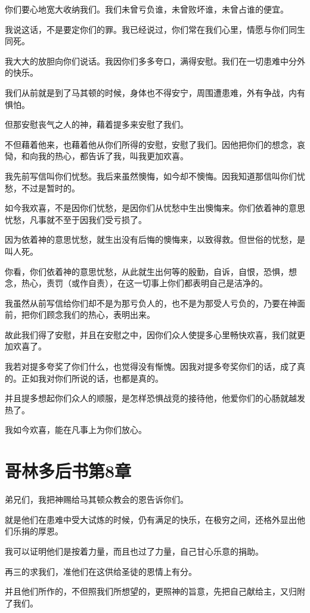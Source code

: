 \documentclass[12pt,oneside]{book}
\begin{document}
你们要心地宽大收纳我们。我们未曾亏负谁，未曾败坏谁，未曾占谁的便宜。

我说这话，不是要定你们的罪。我已经说过，你们常在我们心里，情愿与你们同生同死。

我大大的放胆向你们说话。我因你们多多夸口，满得安慰。我们在一切患难中分外的快乐。

我们从前就是到了马其顿的时候，身体也不得安宁，周围遭患难，外有争战，内有惧怕。

但那安慰丧气之人的神，藉着提多来安慰了我们。

不但藉着他来，也藉着他从你们所得的安慰，安慰了我们。因他把你们的想念，哀恸，和向我的热心，都告诉了我，叫我更加欢喜。

我先前写信叫你们忧愁。我后来虽然懊悔，如今却不懊悔。因我知道那信叫你们忧愁，不过是暂时的。

如今我欢喜，不是因你们忧愁，是因你们从忧愁中生出懊悔来。你们依着神的意思忧愁，凡事就不至于因我们受亏损了。

因为依着神的意思忧愁，就生出没有后悔的懊悔来，以致得救。但世俗的忧愁，是叫人死。

你看，你们依着神的意思忧愁，从此就生出何等的殷勤，自诉，自恨，恐惧，想念，热心，责罚（或作自责），在这一切事上你们都表明自己是洁净的。

我虽然从前写信给你们却不是为那亏负人的，也不是为那受人亏负的，乃要在神面前，把你们顾念我们的热心，表明出来。

故此我们得了安慰，并且在安慰之中，因你们众人使提多心里畅快欢喜，我们就更加欢喜了。

我若对提多夸奖了你们什么，也觉得没有惭愧。因我对提多夸奖你们的话，成了真的。正如我对你们所说的话，也都是真的。

并且提多想起你们众人的顺服，是怎样恐惧战竞的接待他，他爱你们的心肠就越发热了。

我如今欢喜，能在凡事上为你们放心。

\chapter{哥林多后书第8章}
弟兄们，我把神赐给马其顿众教会的恩告诉你们。

就是他们在患难中受大试炼的时候，仍有满足的快乐，在极穷之间，还格外显出他们乐捐的厚恩。

我可以证明他们是按着力量，而且也过了力量，自己甘心乐意的捐助。

再三的求我们，准他们在这供给圣徒的恩情上有分。

并且他们所作的，不但照我们所想望的，更照神的旨意，先把自己献给主，又归附了我们。
\end{document}
